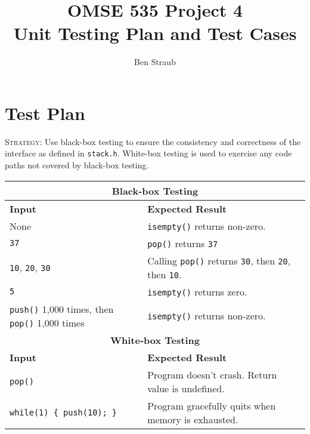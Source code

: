 \documentclass[11pt]{article}
\begin{document}
\title{OMSE 535 Project 4 \\ Unit Testing Plan and Test Cases}
\author{Ben Straub}
\maketitle

\section{Test Plan}

\textsc{Strategy:} Use black-box testing to ensure the consistency and correctness of the interface
as defined in \texttt{stack.h}.  White-box testing is used to exercise any code paths not covered by
black-box testing.

\begin{center}
  \begin{tabular}[h]{|l|l|}
    \hline
    \multicolumn{2}{|c|}{\bf Black-box Testing}                                                                                                    \\
    \hline \hline
    \textbf{Input}                                               & \textbf{Expected Result}                                                        \\
    \hline \hline
    None                                                         & \texttt{isempty()} returns non-zero.                                            \\
    \texttt{37}                                                  & \texttt{pop()} returns \texttt{37}                                              \\
    \texttt{10}, \texttt{20}, \texttt{30}                        & Calling \texttt{pop()} returns \texttt{30}, then \texttt{20}, then \texttt{10}. \\
    \texttt{5}                                                   & \texttt{isempty()} returns zero.                                                \\
    \texttt{push()} 1,000 times, then \texttt{pop()} 1,000 times & \texttt{isempty()} returns non-zero.                                            \\
    \hline \hline
    \multicolumn{2}{|c|}{\bf White-box Testing}                                                                                                    \\
    \hline \hline
    \textbf{Input}                                               & \textbf{Expected Result}                                                        \\
    \hline \hline
    \texttt{pop()}                                               & Program doesn't crash.  Return value is undefined.                              \\
    \texttt{while(1) \{ push(10); \}}                            & Program gracefully quits when memory is exhausted.                              \\
    \hline
  \end{tabular}
\end{center}
\end{document}
